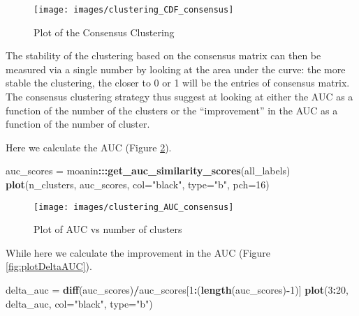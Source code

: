 \documentclass[9pt,a4paper,]{extarticle}
\newenvironment{Shaded}{\begin{snugshade}}{\end{snugshade}}
\newcommand{\DataTypeTok}[1]{\textcolor[rgb]{0.13,0.29,0.53}{#1}}
\newcommand{\DecValTok}[1]{\textcolor[rgb]{0.00,0.00,0.81}{#1}}
\newcommand{\KeywordTok}[1]{\textcolor[rgb]{0.13,0.29,0.53}{\textbf{#1}}}
\newcommand{\NormalTok}[1]{#1}
\newcommand{\OperatorTok}[1]{\textcolor[rgb]{0.81,0.36,0.00}{\textbf{#1}}}
\newcommand{\StringTok}[1]{\textcolor[rgb]{0.31,0.60,0.02}{#1}}
\begin{document}
\begin{figure}[H]

{\centering \texttt{[image: images/clustering\_CDF\_consensus]} 

}

\caption{Plot of the Consensus Clustering}\label{fig:plotCdfConsensus}
\end{figure}

The stability of the clustering based on the consensus matrix can then be
measured via a single number by looking at the area under the curve: the more
stable the clustering, the closer to 0 or 1 will be the entries of consensus
matrix. The consensus clustering strategy thus suggest at looking at either
the AUC as a function of the number of the clusters or the ``improvement'' in
the AUC as a function of the number of cluster.

Here we calculate the AUC (Figure \ref{fig:plotAUC}).

\begin{Shaded}
\begin{Highlighting}[]
\NormalTok{auc_scores =}\StringTok{ }\NormalTok{moanin}\OperatorTok{:::}\KeywordTok{get_auc_similarity_scores}\NormalTok{(all_labels)}
\KeywordTok{plot}\NormalTok{(n_clusters, auc_scores, }\DataTypeTok{col=}\StringTok{"black"}\NormalTok{, }\DataTypeTok{type=}\StringTok{"b"}\NormalTok{, }\DataTypeTok{pch=}\DecValTok{16}\NormalTok{)}
\end{Highlighting}
\end{Shaded}

\begin{figure}[H]

{\centering \texttt{[image: images/clustering\_AUC\_consensus]} 

}

\caption{Plot of AUC vs number of clusters}\label{fig:plotAUC}
\end{figure}

While here we calculate the improvement in the AUC (Figure \ref{fig:plotDeltaAUC}).

\begin{Shaded}
\begin{Highlighting}[]
\NormalTok{delta_auc =}\StringTok{ }\KeywordTok{diff}\NormalTok{(auc_scores)}\OperatorTok{/}\NormalTok{auc_scores[}\DecValTok{1}\OperatorTok{:}\NormalTok{(}\KeywordTok{length}\NormalTok{(auc_scores)}\OperatorTok{-}\DecValTok{1}\NormalTok{)]}
\KeywordTok{plot}\NormalTok{(}\DecValTok{3}\OperatorTok{:}\DecValTok{20}\NormalTok{, delta_auc, }\DataTypeTok{col=}\StringTok{"black"}\NormalTok{, }\DataTypeTok{type=}\StringTok{"b"}\NormalTok{)}
\end{Highlighting}
\end{Shaded}
\end{document}
